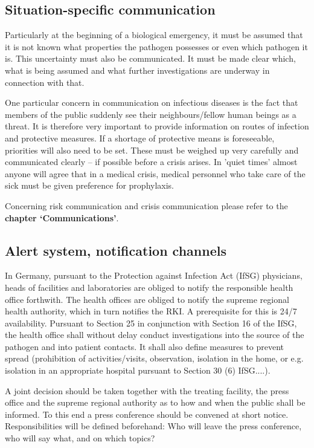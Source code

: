 \documentclass{article}
\begin{document}
\subsection{Situation-specific communication}\label{H6106167}



Particularly at the beginning of a biological emergency, it must be assumed that it is not known what properties the pathogen possesses or even which pathogen it is. This uncertainty must also be communicated. It must be made clear which, what is being assumed and what further investigations are underway in connection with that.


One particular concern in communication on infectious diseases is the fact that members of the public suddenly see their neighbours/fellow human beings as a threat. It is therefore very important to provide information on routes of infection and protective measures. If a shortage of protective means is foreseeable, priorities will also need to be set. These must be weighed up very carefully and communicated clearly – if possible before a crisis arises. In 'quiet times' almost anyone will agree that in a medical crisis, medical personnel who take care of the sick must be given preference for prophylaxis.


Concerning risk communication and crisis communication please refer to the \textbf{chapter ‘Communications’}.


\subsection{Alert system, notification channels}\label{H7109995}



In Germany, pursuant to the Protection against Infection Act (IfSG) physicians, heads of facilities and laboratories are obliged to notify the responsible health office forthwith. The health offices are obliged to notify the supreme regional health authority, which in turn notifies the RKI. A prerequisite for this is 24/7 availability. Pursuant to Section 25 in conjunction with Section 16 of the IfSG, the health office shall without delay conduct investigations into the source of the pathogen and into patient contacts. It shall also define measures to prevent spread (prohibition of activities/visits, observation, isolation in the home, or e.g. isolation in an appropriate hospital pursuant to Section 30 (6) IfSG....).


A joint decision should be taken together with the treating facility, the press office and the supreme regional authority as to how and when the public shall be informed. To this end a press conference should be convened at short notice. Responsibilities will be defined beforehand: Who will leave the press conference, who will say what, and on which topics?
\end{document}
